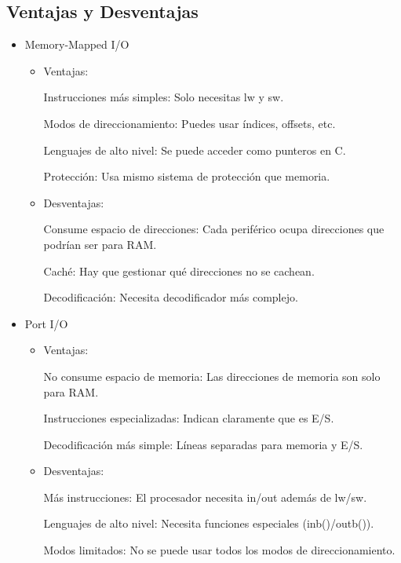 \documentclass{article}
\begin{document}
\subsection{Ventajas y Desventajas}
\begin{itemize}
    \item Memory-Mapped I/O
    \begin{itemize}
        \item Ventajas:

        Instrucciones más simples: Solo necesitas lw y sw.

        Modos de direccionamiento: Puedes usar índices, offsets, etc.

        Lenguajes de alto nivel: Se puede acceder como punteros en C.

        Protección: Usa mismo sistema de protección que memoria.

        \item Desventajas:
        
        Consume espacio de direcciones: Cada periférico ocupa direcciones que podrían ser para RAM.

        Caché: Hay que gestionar qué direcciones no se cachean.

        Decodificación: Necesita decodificador más complejo.
    \end{itemize}
    \item Port I/O
    \begin{itemize}
        \item Ventajas:
        
        No consume espacio de memoria: Las direcciones de memoria son solo para RAM.

        Instrucciones especializadas: Indican claramente que es E/S.

        Decodificación más simple: Líneas separadas para memoria y E/S.
        
        \item Desventajas:

        Más instrucciones: El procesador necesita in/out además de lw/sw.

        Lenguajes de alto nivel: Necesita funciones especiales (inb()/outb()).

        Modos limitados: No se puede usar todos los modos de direccionamiento.
        
    \end{itemize}
\end{itemize}
\end{document}
